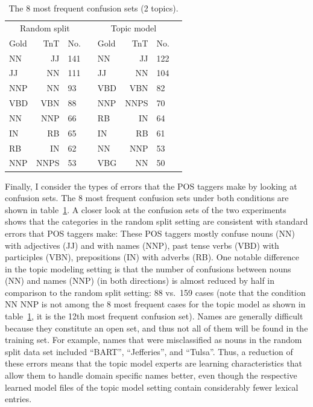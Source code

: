 \begin{table}[t]
	\begin{center}
		\begin{tabular}{lrlr|lrlr}
			\multicolumn{3}{c}{Random split} &&  \multicolumn{3}{|c}{Topic model}\\
			Gold & TnT & No. & &  Gold & TnT & No. \\
			\hline
			NN &      JJ &	141   & & NN  & JJ & 122\\
			JJ &       NN & 111   & & JJ  & NN & 104\\
			NNP &      NN & 93         & & VBD & VBN & 82\\
			VBD &      VBN & 88   & & NNP & NNPS & 70\\
			NN &       NNP & 66        & & RB  & IN & 64\\
			IN &       RB & 65         & & IN  & RB & 61\\
			RB    &  IN & 62           & & NN  & NNP & 53\\
			NNP &      NNPS & 53       & & VBG & NN & 50\\
			\hline 
		\end{tabular}
	\end{center}
	\caption{The 8 most frequent confusion sets (2 topics).\label{tab:res:confus}}
\end{table}

Finally, I consider the types of errors that the POS taggers make by looking at confusion sets. %
The 8 most frequent confusion sets under both conditions are shown in table~\ref{tab:res:confus}. A closer look at the confusion sets of the two experiments shows that the categories in the random split setting are consistent with standard errors that POS taggers make: These POS taggers mostly confuse nouns (NN) with adjectives (JJ) and with names (NNP), past tense verbs (VBD) with participles (VBN), prepositions (IN) with adverbs (RB). One notable difference in the topic modeling setting is that the number of confusions between nouns (NN) and names (NNP) (in both directions) is almost reduced by half in comparison to the random split setting: 88 vs.\ 159 cases (note that the condition NN NNP is not among the 8 most frequent cases for the topic model as shown in table~\ref{tab:res:confus}, it is the 12th most frequent confusion set). Names are generally difficult because they constitute an open set, and thus not all of them will be found in the training set. For example, names that were misclassified as nouns in the random split data set included ``BART'', ``Jefferies'', and ``Tulsa''. Thus, a reduction of these errors means that the topic model experts are learning characteristics that allow them to handle domain specific names better, even though the respective learned model files of the topic model setting contain considerably fewer lexical entries.



